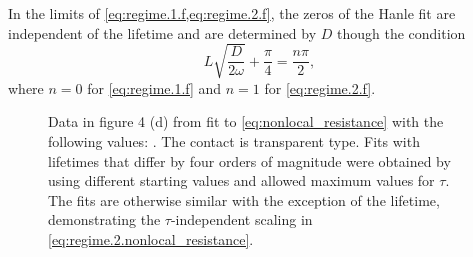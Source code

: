 In the limits of \cref{eq:regime.1.f,eq:regime.2.f},
the zeros of the Hanle fit are independent of the lifetime
and are determined by $D$ though the condition
\begin{equation}
  L \sqrt{\frac{D}{2 ω}} + \frac{π}{4} = \frac{n π}{2} ,
\end{equation}
where $n = 0$ for \cref{eq:regime.1.f} and $n = 1$ for \cref{eq:regime.2.f}.

\begin{figure}[!b]
  \caption{
    Data in figure 4 (d) from \cite{PhysRevLett.105.167202}
    fit to \cref{eq:nonlocal_resistance}
    with the following values: \plotLargeLifetimeInfo.
    The contact is transparent type.
    Fits with lifetimes that differ by four orders of magnitude were obtained by using
    different starting values and allowed maximum values for $τ$.
    The fits are otherwise similar with the exception of the lifetime,
    demonstrating the $τ$-independent scaling in \cref{eq:regime.2.nonlocal_resistance}.
  }
  \label{fig:nonlocal_resistance.large_lifetime}

\end{figure}

